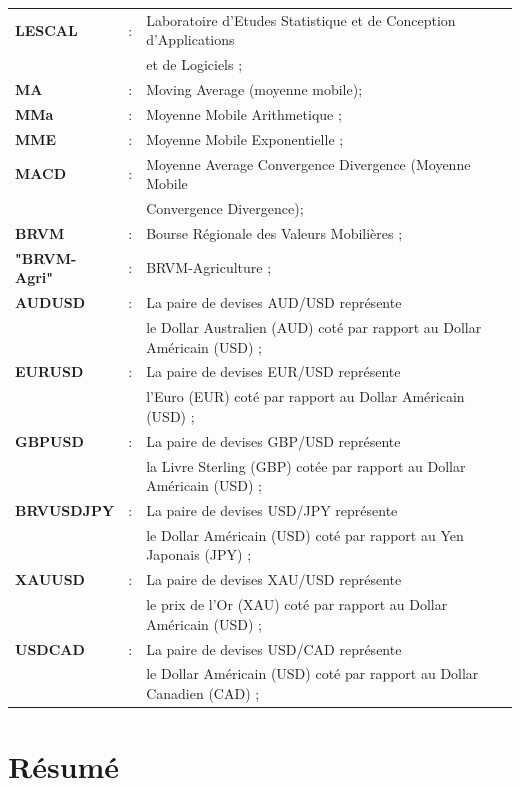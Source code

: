 \begin{longtable}[]{@{}lll@{}}
\toprule\noalign{}
\endhead
\bottomrule\noalign{}
\endlastfoot
\textbf{LESCAL} & : & Laboratoire d'Etudes Statistique et de Conception
d'Applications \\
& & et de Logiciels ; \\
\textbf{MA} & : & Moving Average (moyenne mobile); \\
\textbf{MMa} & : & Moyenne Mobile Arithmetique ; \\
\textbf{MME} & : & Moyenne Mobile Exponentielle ; \\
\textbf{MACD} & : & Moyenne Average Convergence Divergence (Moyenne
Mobile \\
& & Convergence Divergence); \\
\textbf{BRVM} & : & Bourse Régionale des Valeurs Mobilières ; \\
\textbf{"BRVM-Agri"} & : & BRVM-Agriculture ; \\
\textbf{AUDUSD} & : & La paire de devises AUD/USD représente \\
& & le Dollar Australien (AUD) coté par rapport au Dollar Américain
(USD) ; \\
\textbf{EURUSD} & : & La paire de devises EUR/USD représente \\
& & l'Euro (EUR) coté par rapport au Dollar Américain (USD) ; \\
\textbf{GBPUSD} & : & La paire de devises GBP/USD représente \\
& & la Livre Sterling (GBP) cotée par rapport au Dollar Américain (USD)
; \\
\textbf{BRVUSDJPY} & : & La paire de devises USD/JPY représente \\
& & le Dollar Américain (USD) coté par rapport au Yen Japonais (JPY)
; \\
\textbf{XAUUSD} & : & La paire de devises XAU/USD représente \\
& & le prix de l'Or (XAU) coté par rapport au Dollar Américain (USD)
; \\
\textbf{USDCAD} & : & La paire de devises USD/CAD représente \\
& & le Dollar Américain (USD) coté par rapport au Dollar Canadien (CAD)
; \\
\end{longtable}

\section*{Résumé}\label{ruxe9sumuxe9}

